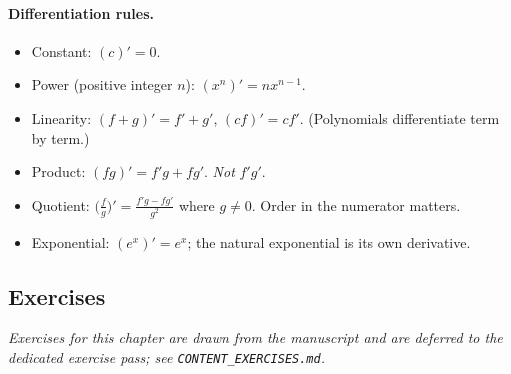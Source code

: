 \paragraph{Differentiation rules.}
\begin{itemize}
    \item Constant: \((c)' = 0\).
    \item Power (positive integer \(n\)): \((x^{n})' = n x^{n - 1}\).
    \item Linearity: \((f + g)' = f' + g'\), \((c f)' = c f'\). (Polynomials differentiate term by term.)
    \item Product: \((f g)' = f' g + f g'\). \emph{Not} \(f' g'\).
    \item Quotient: \(\bigl(\tfrac{f}{g}\bigr)' = \tfrac{f' g - f g'}{g^{2}}\) where \(g \neq 0\). Order in the numerator matters.
    \item Exponential: \((e^{x})' = e^{x}\); the natural exponential is its own derivative.
\end{itemize}

\subsection*{Exercises}

\emph{Exercises for this chapter are drawn from the manuscript and are deferred to the dedicated exercise pass; see \texttt{CONTENT\_EXERCISES.md}.}

